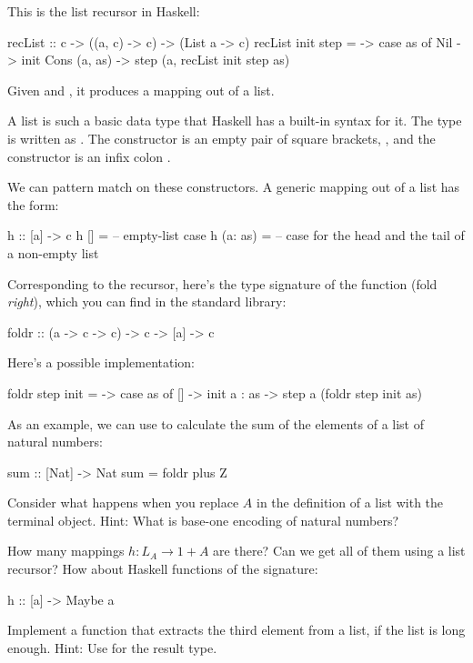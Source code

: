 \documentclass[DaoFP]{subfiles}
\begin{document}
This is the list recursor in Haskell:
\begin{haskell}
recList :: c -> ((a, c) -> c) -> (List a -> c)
recList init step = \as ->
  case as of 
    Nil          -> init
    Cons (a, as) -> step (a, recList init step as)
\end{haskell}
Given  and , it produces a mapping out of a list.

A list is such a basic data type that Haskell has a built-in syntax for it. The type  is written as \hask{[a]}. The  constructor is an empty pair of square brackets, \hask{[]}, and the  constructor is an infix colon \hask{:}.

We can pattern match on these constructors. A generic mapping out of a list has the form:
\begin{haskell}
h :: [a] -> c
h []      = -- empty-list case
h (a: as) = -- case for the head and the tail of a non-empty list
\end{haskell}

Corresponding to the recursor, here's the type signature of the function  (fold \emph{right}), which you can find in the standard library:
\begin{haskell}
foldr :: (a -> c -> c) -> c -> [a] -> c
\end{haskell}
Here's a possible implementation:
\begin{haskell}
foldr step init = \as ->
  case as of
    [] -> init
    a : as -> step a (foldr step init as)
\end{haskell}

As an example, we can use  to calculate the sum of the elements of a list of natural numbers:
\begin{haskell}
sum :: [Nat] -> Nat
sum = foldr plus Z
\end{haskell}


\begin{exercise}
Consider what happens when you replace $A$ in the definition of a list with the terminal object. Hint: What is base-one encoding of natural numbers?
\end{exercise}
\begin{exercise}
How many mappings $h \colon L_A \to 1 + A$ are there? Can we get all of them using a list recursor? How about Haskell functions of the signature:
\begin{haskell}
h :: [a] -> Maybe a
\end{haskell}
\end{exercise}
\begin{exercise}
Implement a function that extracts the third element from a list, if the list is long enough. Hint: Use  for the result type.
\end{exercise}
\end{document}
